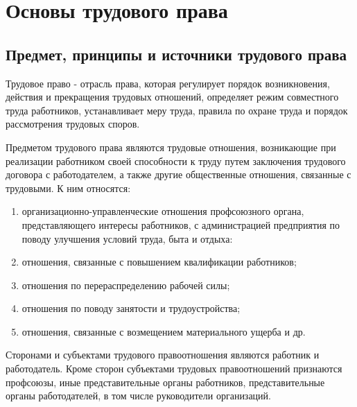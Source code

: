 \section{Основы трудового права}


\subsection{Предмет, принципы и источники трудового права}
Трудовое право - отрасль права, которая регулирует порядок возникновения, действия и прекращения трудовых отношений, определяет режим совместного труда работников, устанавливает меру труда, правила по охране труда и порядок рассмотрения трудовых споров.

Предметом трудового права являются трудовые отношения, возникающие при реализации работником своей способности к труду путем заключения трудового договора с работодателем, а также другие общественные отношения, связанные с трудовыми. К ним относятся:

\begin{enumerate}
	\item организационно-управленческие отношения профсоюзного органа, представляющего интересы работников, с администрацией предприятия по поводу улучшения условий труда, быта и отдыха:
	\item отношения, связанные с повышением квалификации работников;
	\item отношения по перераспределению рабочей силы;
	\item отношения по поводу занятости и трудоустройства;
	\item отношения, связанные с возмещением материального ущерба и др.
\end{enumerate}

Сторонами и субъектами трудового правоотношения являются работник и работодатель. Кроме сторон субъектами трудовых правоотношений признаются профсоюзы, иные представительные органы работников, представительные органы работодателей, в том числе руководители организаций.

